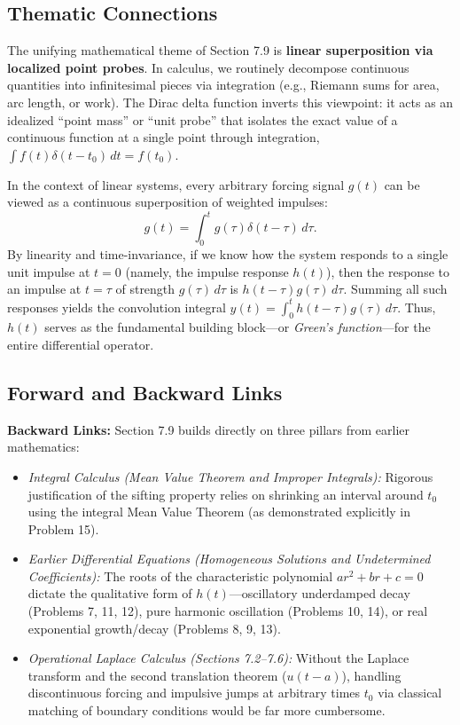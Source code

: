 \documentclass[11pt, letterpaper]{article}
\theoremstyle{definition}
\theoremstyle{remark}
\begin{document}
\subsection{Thematic Connections}
The unifying mathematical theme of Section 7.9 is \textbf{linear superposition via localized point probes}. In calculus, we routinely decompose continuous quantities into infinitesimal pieces via integration (e.g., Riemann sums for area, arc length, or work). The Dirac delta function inverts this viewpoint: it acts as an idealized ``point mass'' or ``unit probe'' that isolates the exact value of a continuous function at a single point through integration, $\int f(t)\delta(t - t_0)\,dt = f(t_0)$.

In the context of linear systems, every arbitrary forcing signal $g(t)$ can be viewed as a continuous superposition of weighted impulses:
\[
    g(t) = \int_{0}^{t} g(\tau)\delta(t - \tau)\,d\tau.
\]
By linearity and time-invariance, if we know how the system responds to a single unit impulse at $t = 0$ (namely, the impulse response $h(t)$), then the response to an impulse at $t = \tau$ of strength $g(\tau)\,d\tau$ is $h(t - \tau)g(\tau)\,d\tau$. Summing all such responses yields the convolution integral $y(t) = \int_0^t h(t - \tau)g(\tau)\,d\tau$. Thus, $h(t)$ serves as the fundamental building block—or \emph{Green's function}—for the entire differential operator.

\subsection{Forward and Backward Links}
\textbf{Backward Links:} Section 7.9 builds directly on three pillars from earlier mathematics:
\begin{itemize}
    \item \emph{Integral Calculus (Mean Value Theorem and Improper Integrals):} Rigorous justification of the sifting property relies on shrinking an interval around $t_0$ using the integral Mean Value Theorem (as demonstrated explicitly in Problem 15).
    \item \emph{Earlier Differential Equations (Homogeneous Solutions and Undetermined Coefficients):} The roots of the characteristic polynomial $ar^2 + br + c = 0$ dictate the qualitative form of $h(t)$—oscillatory underdamped decay (Problems 7, 11, 12), pure harmonic oscillation (Problems 10, 14), or real exponential growth/decay (Problems 8, 9, 13).
    \item \emph{Operational Laplace Calculus (Sections 7.2--7.6):} Without the Laplace transform and the second translation theorem ($u(t - a)$), handling discontinuous forcing and impulsive jumps at arbitrary times $t_0$ via classical matching of boundary conditions would be far more cumbersome.
\end{itemize}
\end{document}
